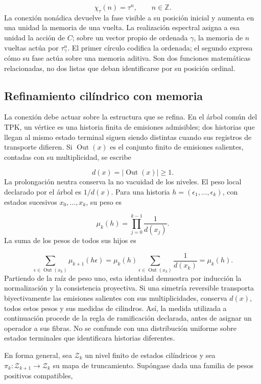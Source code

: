 \[
\chi_\tau(n)=\tau^n,\qquad n\in\mathbb Z.
\]
La conexión nonádica devuelve la fase visible a su posición inicial y aumenta en una unidad la memoria de una vuelta. La realización espectral asigna a esa unidad la acción de \(C\); sobre un vector propio de ordenada \(\gamma\), la memoria de \(n\) vueltas actúa por \(\tau_\gamma^n\). El primer círculo codifica la ordenada; el segundo expresa cómo su fase actúa sobre una memoria aditiva. Son dos funciones matemáticas relacionadas, no dos listas que deban identificarse por su posición ordinal.

\subsection{Refinamiento cilíndrico con memoria}
La conexión debe actuar sobre la estructura que se refina. En el árbol común del TPK, un vértice es una historia finita de emisiones admisibles; dos historias que llegan al mismo estado terminal siguen siendo distintas cuando sus registros de transporte difieren. Si \(\operatorname{Out}(x)\) es el conjunto finito de emisiones salientes, contadas con su multiplicidad, se escribe

\[
d(x)=|\operatorname{Out}(x)|\geq1.
\]
La prolongación neutra conserva la no vacuidad de los niveles. El peso local declarado por el árbol es \(1/d(x)\). Para una historia \(h=(\epsilon_1,\ldots,\epsilon_k)\), con estados sucesivos \(x_0,\ldots,x_k\), su peso es

\[
\mu_k(h)=\prod_{j=0}^{k-1}\frac1{d(x_j)}.
\]
La suma de los pesos de todos sus hijos es

\[
\sum_{\epsilon\in\operatorname{Out}(x_k)}
\mu_{k+1}(h\epsilon)
=\mu_k(h)\sum_{\epsilon\in\operatorname{Out}(x_k)}\frac1{d(x_k)}
=\mu_k(h).
\]
Partiendo de la raíz de peso uno, esta identidad demuestra por inducción la normalización y la consistencia proyectiva. Si una simetría reversible transporta biyectivamente las emisiones salientes con sus multiplicidades, conserva \(d(x)\), todos estos pesos y sus medidas de cilindros. Así, la medida utilizada a continuación procede de la regla de ramificación declarada, antes de asignar un operador a sus fibras. No se confunde con una distribución uniforme sobre estados terminales que identificara historias diferentes.

En forma general, sea \(\mathcal Z_k\) un nivel finito de estados cilíndricos y sea \(\pi_k:\mathcal Z_{k+1}\to\mathcal Z_k\) su mapa de truncamiento. Supóngase dada una familia de pesos positivos compatibles,

